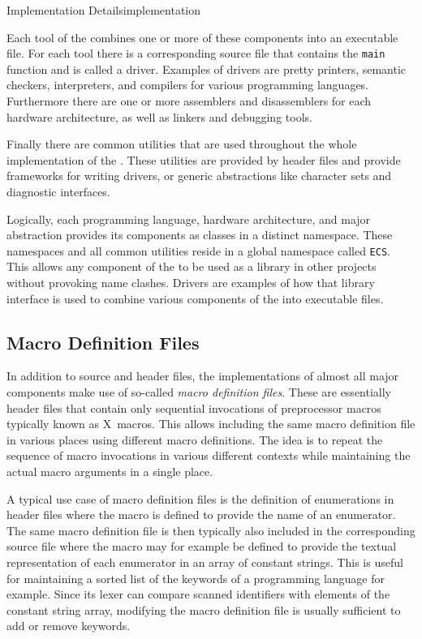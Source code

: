 \begin{presentation}{Implementation Details}{implementation}

Each tool of the \ecs{} combines one or more of these components into an executable file.
For each tool there is a corresponding source file that contains the \texttt{main} function and is called a driver.
Examples of drivers are pretty printers, semantic checkers, interpreters, and compilers for various programming languages.
Furthermore there are one or more assemblers and disassemblers for each hardware architecture, as well as linkers and debugging tools.


Finally there are common utilities that are used throughout the whole implementation of the \ecs{}.
These utilities are provided by header files and provide frameworks for writing drivers, or generic abstractions like character sets and diagnostic interfaces.

Logically, each programming language, hardware architecture, and major abstraction provides its components as classes in a distinct namespace.
These namespaces and all common utilities reside in a global namespace called \texttt{ECS}.
This allows any component of the \ecs{} to be used as a library in other projects without provoking name clashes.
Drivers are examples of how that library interface is used to combine various components of the \ecs{} into executable files.


\subsection{Macro Definition Files}

In addition to source and header files, the implementations of almost all major components make use of so-called \emph{macro definition files}.
These are essentially header files that contain only sequential invocations of preprocessor macros typically known as X~macros.
This allows including the same macro definition file in various places using different macro definitions.
The idea is to repeat the sequence of macro invocations in various different contexts while maintaining the actual macro arguments in a single place.


A typical use case of macro definition files is the definition of enumerations in header files where the macro is defined to provide the name of an enumerator.
The same macro definition file is then typically also included in the corresponding source file where the macro may for example be defined to provide the textual representation of each enumerator in an array of constant strings.
This is useful for maintaining a sorted list of the keywords of a programming language for example.
Since its lexer can compare scanned identifiers with elements of the constant string array, modifying the macro definition file is usually sufficient to add or remove keywords.


\end{presentation}
